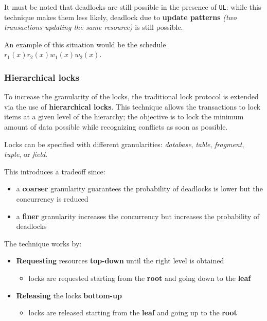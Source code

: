 \documentclass[english]{article}
\begin{document}
\bigskip
It must be noted that deadlocks are still possible in the presence of \texttt{UL}:
while this technique makes them less likely, deadlock due to \textbf{update patterns} \textit{(two transactions updating the same resource)} is still possible.

An example of this situation would be the schedule \(r_1(x) r_2(x) w_1(x) w_2(x)\).

\subsubsection{Hierarchical locks}

To increase the granularity of the locks, the traditional lock protocol is extended via the use of \textbf{hierarchical locks}.
This technique allows the transactions to lock items at a given level of the hierarchy;
the objective is to lock the minimum amount of data possible while recognizing conflicts as soon as possible.

\begin{minipage}{0.8\textwidth}
  \bigskip
  Locks can be specified with different granularities: \textit{database}, \textit{table}, \textit{fragment}, \textit{tuple}, or \textit{field}.

  This introduces a tradeoff since:
  \begin{itemize}
    \item a \textbf{coarser} granularity guarantees the probability of deadlocks is lower but the concurrency is reduced
    \item a \textbf{finer} granularity increases the concurrency but increases the probability of deadlocks
  \end{itemize}
  \bigskip
\end{minipage}
\begin{minipage}{0.195\textwidth}
  \bigskip
  \centering
  \bigskip
\end{minipage}

\bigskip
The technique works by:

\begin{itemize}
  \item \textbf{Requesting} resources \textbf{top-down} until the right level is obtained
        \begin{itemize}[label=\(\downarrow\)]
          \item locks are requested starting from the \textbf{root} and going down to the \textbf{leaf}
        \end{itemize}
  \item \textbf{Releasing} the locks \textbf{bottom-up}
        \begin{itemize}[label=\(\uparrow\)]
          \item locks are released starting from the \textbf{leaf} and going up to the \textbf{root}
        \end{itemize}
\end{itemize}
\end{document}
